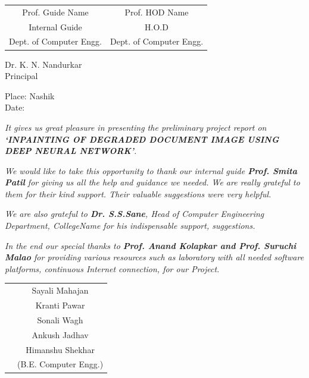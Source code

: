 \documentclass[oneside,a4paper,12pt]{report}
\begin{document}
\bgroup
\def\arraystretch{0.7}
\begin{tabular}{c c }
Prof. Guide Name &  \hspace{50 mm} Prof. HOD Name \\								
Internal Guide   &  \hspace{50 mm} H.O.D \\
Dept. of Computer Engg.  &	\hspace{50 mm}Dept. of Computer Engg.  \\
\end{tabular}
\vspace*{0.1\baselineskip} 
\begin{center}
{
Dr. K. N. Nandurkar \\
Principal\\
}
\end{center}
Place: Nashik\\
Date: 



\newpage


\setcounter{page}{0}
\frontmatter
{}
\rfoot{\thepage}


		

{   \setlength{\parindent}{11mm} }
{ \setlength{\parindent}{0mm} }
\textit{It gives us great pleasure in presenting the preliminary project report 
on {\bfseries \fontsize{12}{12} \selectfont `INPAINTING OF DEGRADED DOCUMENT IMAGE USING 
DEEP NEURAL NETWORK'}.}
\vspace*{1.5\baselineskip}

 \textit{We would like to take this opportunity to thank our internal guide
 \textbf{Prof. Smita Patil} for giving us all the help and guidance we needed. We are
 really grateful to them for their kind support. Their valuable suggestions were very helpful.} \vspace*{1.5\baselineskip}

 \textit{We are also grateful to \textbf{Dr. S.S.Sane}, Head of Computer
 Engineering Department, CollegeName for his indispensable
 support, suggestions.}
\vspace*{1.5\baselineskip}

\textit{In the end our special thanks to \textbf{Prof. Anand Kolapkar and Prof. Suruchi Malao} for
providing various resources such as  laboratory with all needed software platforms,
continuous Internet connection, for our Project.}
\vspace*{3\baselineskip} \\
\begin{tabular}{p{8.2cm}c}
&Sayali Mahajan\\
&Kranti Pawar\\
&Sonali Wagh\\
&Ankush Jadhav\\
&Himanshu Shekhar\\
&(B.E. Computer Engg.)
\end{tabular}
\end{document}
